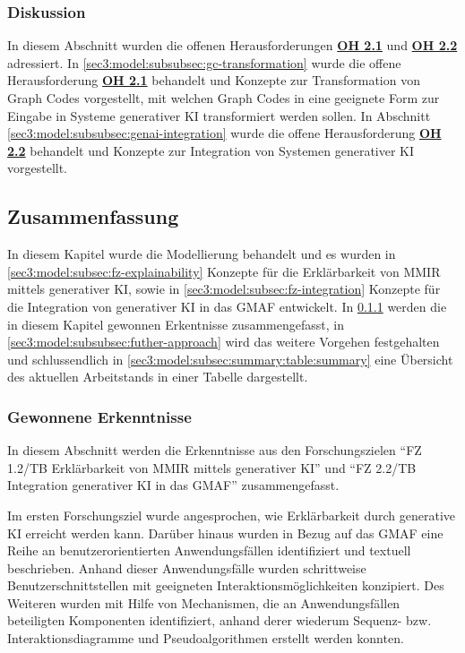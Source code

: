 \FloatBarrier

\subsubsection{Diskussion}
\label{sec3:model:subsubsec:fz2:discussion}
In diesem Abschnitt wurden die offenen Herausforderungen \hyperref[sec2:sota:oi:2.1]{\textbf{OH 2.1}} und \hyperref[sec2:sota:oi:2.2]{\textbf{OH 2.2}} adressiert.
In \cref{sec3:model:subsubsec:gc-transformation} wurde die offene Herausforderung \hyperref[sec2:sota:oi:2.1]{\textbf{OH 2.1}} behandelt und Konzepte zur Transformation von Graph Codes vorgestellt, mit welchen Graph Codes in eine geeignete Form zur Eingabe in Systeme generativer KI transformiert werden sollen.
In Abschnitt \cref{sec3:model:subsubsec:genai-integration} wurde die offene Herausforderung \hyperref[sec2:sota:oi:2.2]{\textbf{OH 2.2}} behandelt und Konzepte zur Integration von Systemen generativer KI vorgestellt.

\clearpage

\subsection{Zusammenfassung}
\label{sec3:model:subsec:summary}
In diesem Kapitel wurde die Modellierung behandelt und es wurden in \cref{sec3:model:subsec:fz-explainability} Konzepte für die Erklärbarkeit von MMIR mittels generativer KI, sowie in \cref{sec3:model:subsec:fz-integration} Konzepte für die Integration von generativer KI in das GMAF entwickelt.
In \cref{sec3:model:subsubsec:summary-findings} werden die in diesem Kapitel gewonnen Erkentnisse zusammengefasst, in \cref{sec3:model:subsubsec:futher-approach} wird das weitere Vorgehen festgehalten und schlussendlich in \cref{sec3:model:subsec:summary:table:summary} eine Übersicht des aktuellen Arbeitstands in einer Tabelle dargestellt.

\subsubsection{Gewonnene Erkenntnisse}
\label{sec3:model:subsubsec:summary-findings}
In diesem Abschnitt werden die Erkenntnisse aus den Forschungszielen \enquote{FZ 1.2/TB Erklärbarkeit von MMIR mittels generativer KI} und \enquote{FZ 2.2/TB Integration generativer KI in das GMAF} zusammengefasst.

Im ersten Forschungsziel wurde angesprochen, wie Erklärbarkeit durch generative KI erreicht werden kann.
Darüber hinaus wurden in Bezug auf das GMAF eine Reihe an benutzerorientierten Anwendungsfällen identifiziert und textuell beschrieben.
Anhand dieser Anwendungsfälle wurden schrittweise Benutzerschnittstellen mit geeigneten Interaktionsmöglichkeiten konzipiert.
Des Weiteren wurden mit Hilfe von Mechanismen, die an Anwendungsfällen beteiligten Komponenten identifiziert, anhand derer wiederum Sequenz- bzw. Interaktionsdiagramme und Pseudoalgorithmen erstellt werden konnten.

